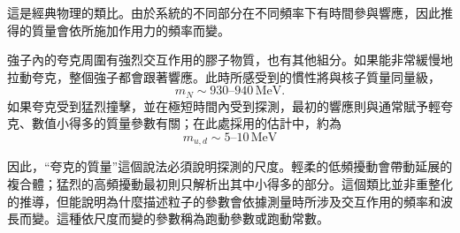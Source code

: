 這是經典物理的類比。由於系統的不同部分在不同頻率下有時間參與響應，因此推得的質量會依所施加作用力的頻率而變。

強子內的夸克周圍有強烈交互作用的膠子物質，也有其他組分。如果能非常緩慢地拉動夸克，整個強子都會跟著響應。此時所感受到的慣性將與核子質量同量級，
\begin{equation}
m_N\sim930\text{--}940\,\mathrm{MeV}.
\end{equation}
如果夸克受到猛烈撞擊，並在極短時間內受到探測，最初的響應則與通常賦予輕夸克、數值小得多的質量參數有關；在此處採用的估計中，約為
\begin{equation}
m_{u,d}\sim5\text{--}10\,\mathrm{MeV}
\end{equation}

因此，``夸克的質量''這個說法必須說明探測的尺度。輕柔的低頻擾動會帶動延展的複合體；猛烈的高頻擾動最初則只解析出其中小得多的部分。這個類比並非重整化的推導，但能說明為什麼描述粒子的參數會依據測量時所涉及交互作用的頻率和波長而變。這種依尺度而變的參數稱為跑動參數或跑動常數。

\begin{classroomqa}
\end{classroomqa}

\begin{classroomqa}
\end{classroomqa}

\begin{classroomqa}
\end{classroomqa}


\begin{classroomqa}
\end{classroomqa}

